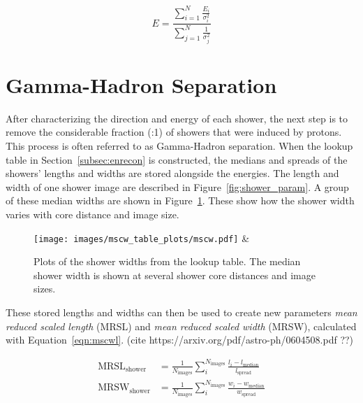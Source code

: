 \begin{equation}\label{eqn:en_avg}
  E = \frac{ \sum_{i=1}^{N} \frac{E_i}{ \sigma_{i}^2} }{ \sum_{j=1}^N \frac{1}{ \sigma_{j}^2 } }
\end{equation}


\section{Gamma-Hadron Separation}

After characterizing the direction and energy of each shower, the next step is to remove the considerable fraction (:1) of showers that were induced by protons.
This process is often referred to as Gamma-Hadron separation.
When the lookup table in Section~\ref{subsec:enrecon} is constructed, the medians and spreads of the showers' lengths and widths are stored alongside the energies.
The length and width of one shower image are described in Figure~\ref{fig:shower_param}.
A group of these median widths are shown in Figure~\ref{fig:mscw_params}.
These show how the shower width varies with core distance and image size.

\begin{figure}[b]
  \centering
  \texttt{[image: images/mscw\_table\_plots/mscw.pdf]} &
  \caption[Shower Median Width]{
    Plots of the shower widths from the lookup table.
    The median shower width is shown at several shower core distances and image sizes.
  }
  \label{fig:mscw_params}
\end{figure}

These stored lengths and widths can then be used to create new parameters \textit{mean reduced scaled length} (MRSL) and \textit{mean reduced scaled width} (MRSW), calculated with Equation~\ref{eqn:mscwl}.
{\color{red}(cite https://arxiv.org/pdf/astro-ph/0604508.pdf ??)}

\begin{equation}\label{eqn:mscwl}
  \begin{split}
    \textrm{MRSL}_{\textrm{shower}} & = \frac{1}{N_{\textrm{images}}} \sum_{i}^{N_{\textrm{images}}} \frac{l_{i}-l_{\textrm{median}}}{l_{\textrm{spread}}} \\
    \textrm{MRSW}_{\textrm{shower}} & = \frac{1}{N_{\textrm{images}}} \sum_{i}^{N_{\textrm{images}}} \frac{w_{i}-w_{\textrm{median}}}{w_{\textrm{spread}}} \\
  \end{split}
\end{equation}

